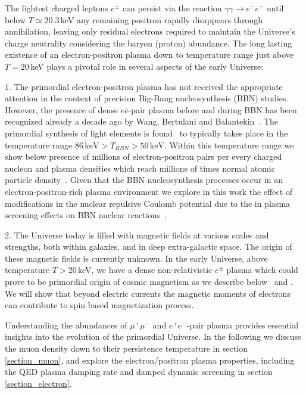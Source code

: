 The lightest charged leptons $e^\pm$ can persist via the reaction $\gamma\gamma\to e^-e^+$ until below $T\simeq 20.3$\,keV any remaining positron rapidly disappears through annihilation, leaving only residual electrons required to maintain the Universe's charge neutrality considering the baryon (proton) abundance. The long lasting existence of an electron-positron plasma down to temperature range just above $T=20$\,keV plays a pivotal role in several aspects of the early Universe: 

1. The primordial electron-positron plasma has not received the appropriate attention in the context of precision Big-Bang nucleosynthesis (BBN) studies. However, the presence of dense $e\bar e$-pair plasma before and during BBN has been recognized already a decade ago by Wang, Bertulani and Balantekin~\cite{Wang:2010px}. The primordial synthesis of light elements is found~\cite{Pitrou:2018cgg} to typically takes place in the temperature range $86\,\mathrm{keV}>T_{BBN}>50\,\mathrm{keV}$. Within this temperature range we show below presence of millions of electron-positron pairs per every charged nucleon and plasma densities which reach millions of times normal atomic particle density~\cite{Yang:2024ret,Grayson:2023flr}. Given that the BBN nucleosynthesis processes occur in an electron-positron-rich plasma environment we explore in this work the effect of modifications in the nuclear repulsive Coulomb potential due to the in plasma screening effects on BBN nuclear reactions~\cite{Grayson:2024okq,Grayson:2024uwg}.  

2. The Universe today is filled with magnetic fields at various scales and strengths, both within galaxies, and in deep extra-galactic space. The origin of these magnetic fields is currently unknown. In the early Universe, above temperature $T>20$\,keV, we have a dense non-relativistic  $e^\pm$ plasma which could prove to be primordial origin of cosmic magnetism as we describe below~\cite{Steinmetz:2023ucp,Rafelski:2023emw,Steinmetz:2023nsc} and . We will show that beyond electric currents the magnetic moments of electrons can contribute to spin based magnetization process.

Understanding the abundances of $\mu^+\mu^-$ and $e^+e^-$-pair plasma provides essential insights into the evolution of the primordial Universe.  In the following we discuss the muon density down to their persistence temperature in section \ref{section_muon}, and explore the electron/positron plasma properties, including the QED plasma damping rate and damped dynamic screening in section \ref{section_electron}.

